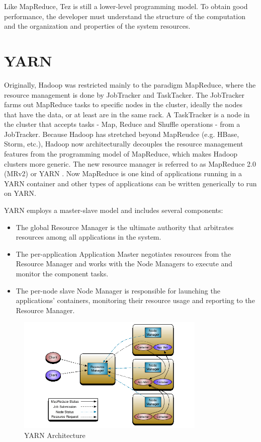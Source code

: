 \documentclass[12pt]{book}
\begin{document}
Like MapReduce, Tez is still a lower-level programming model. To obtain good performance, the developer must understand the structure of the computation and the organization and properties of the system resources. 

\section[YARN]
{YARN}
 Originally, Hadoop was restricted mainly to the paradigm MapReduce, where the resource management is done by JobTracker and TaskTacker.
The JobTracker farms out MapReduce tasks to specific nodes in the cluster, ideally the nodes that have the data, or at least are in the same rack. A TaskTracker is a node in the cluster that accepts tasks - Map, Reduce and Shuffle operations - from a JobTracker. Because Hadoop has stretched beyond MapReudce (e.g. HBase, Storm, etc.), Hadoop now architecturally decouples the resource management features from the programming model of MapReduce, which makes Hadoop clusters more generic. The new resource manager is referred to as MapReduce 2.0 (MRv2) or YARN \cite{YARN2011:279}. Now MapReduce is one kind of applications running in a YARN container and other types of applications can be written generically to run on YARN.

YARN employs a master-slave model and includes several components:
\begin{itemize}
\item The global Resource Manager is the ultimate authority that arbitrates resources among all applications in the system.
\item The per-application Application Master negotiates resources from the Resource Manager and works with the Node Managers to execute and monitor the component tasks.
\item The per-node slave Node Manager is responsible for launching the applications' containers, monitoring their resource usage and reporting to the Resource Manager.
\end{itemize}

\begin{figure}[t]
\includegraphics[width=0.8\textwidth]{images/yarn-architecture.png}
\centering
\caption{YARN Architecture}
\end{figure}
\end{document}
